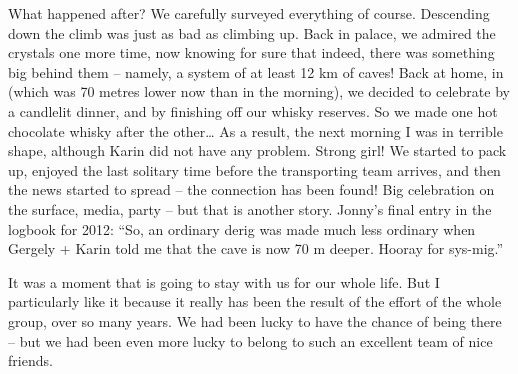 What happened after? We carefully surveyed everything of course.
Descending down the  climb was just as bad as climbing up.
Back in  palace, we admired the crystals one more time,
now knowing for sure that indeed, there was something big behind them --
namely, a system of at least 12 km of caves! Back at home, in
 (which was 70 metres lower now than in the morning), we
decided to celebrate by a candlelit dinner, and by finishing off our
whisky reserves. So we made one hot chocolate whisky after the
other\ldots{} As a result, the next morning I was in terrible shape,
although Karin did not have any problem. Strong girl! We started to pack
up, enjoyed the last solitary time before the transporting team arrives,
and then the news started to spread -- the connection has been found!
Big celebration on the surface, media, party -- but that is another
story. Jonny's final entry in the logbook for 2012: ``So, an ordinary
derig was made much less ordinary when Gergely + Karin told me that the
cave is now 70 m deeper. Hooray for sys-mig.''

It was a moment that is going to stay with us for our whole life. But I
particularly like it because it really has been the result of the effort
of the whole group, over so many years. We had been lucky to have the
chance of being there -- but we had been even more lucky to belong to
such an excellent team of nice friends.

